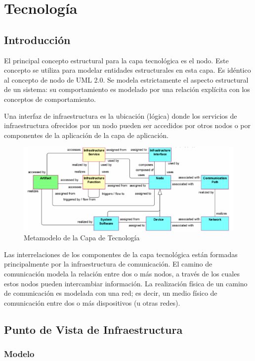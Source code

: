 \chapter{Tecnología}

\section{Introducción}

El principal concepto estructural para la capa tecnológica es el nodo. Este concepto se utiliza para modelar entidades estructurales en esta capa. Es idéntico al concepto de nodo de UML 2.0. Se modela estrictamente el aspecto estructural de un sistema: su comportamiento es modelado por una relación explícita con los conceptos de comportamiento.

Una interfaz de infraestructura es la ubicación (lógica) donde los servicios de infraestructura ofrecidos por un nodo pueden ser accedidos por otros nodos o por componentes de la aplicación de la capa de aplicación.

\begin{figure}[th!]
	\centering
	\includegraphics[width=0.7\linewidth]{arquitectura/imagenes/tecnologia}
	\caption{Metamodelo de la Capa de Tecnología}
	\label{fig:tecnologia}
\end{figure}

Las interrelaciones de los componentes de la capa tecnológica están formadas principalmente por la infraestructura de comunicación. El camino de comunicación modela la relación entre dos o más nodos, a través de los cuales estos nodos pueden intercambiar información. La realización física de un camino de comunicación es modelada con una red; es decir, un medio físico de comunicación entre dos o más dispositivos (u otras redes).


\newpage

\section{Punto de Vista de Infraestructura}

\subsection{Modelo}

